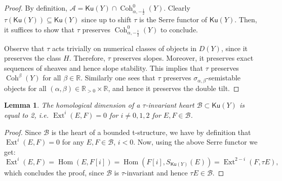 \documentclass[11pt]{amsart}
\newtheorem{lemma}[thm]{Lemma}
\theoremstyle{definition}
\newcommand{\R}{\mathbb{R}}
\DeclareMathOperator{\Hom}{Hom}
\DeclareMathOperator{\Ext}{Ext}
\DeclareMathOperator{\Coh}{Coh}
\newcommand{\sB}{\mathcal{B}}
\newcommand{\AAA}[1]{\textcolor{red}{#1}}
\newcommand{\Ku}{\mathsf{Ku}}
\begin{document}
\begin{proof}
By definition, $\mathcal{A}= \Ku(Y) \cap \Coh^0_{\alpha,-\frac{1}{2}}(Y)$. Clearly $\tau(\Ku(Y))\subseteq \Ku(Y)$ since up to shift $\tau$ is the Serre functor of $\Ku(Y)$. Then, it suffices to show that $\tau$ preserves $\Coh^0_{\alpha,-\frac{1}{2}}(Y)$ to conclude.

Observe that $\tau$ acts trivially on numerical classes of objects in $D(Y)$, since it preserves the class $H$. Therefore, $\tau$ preserves slopes. Moreover, it preserves exact sequences of sheaves and hence slope stability. This implies that $\tau$ preserves $\Coh^\beta(Y)$ for all $\beta\in \R$. Similarly one sees that $\tau$ preserves $\sigma_{\alpha,\beta}$-semistable objects for all $(\alpha,\beta)\in \R_{>0}\times \R$, and hence it preserves the double tilt. %
\end{proof}

\begin{lemma}\label{extdimension}
The homological dimension of a $\tau$-invariant heart $\mathcal{B}\subset \Ku(Y)$ is equal to 2, \textit{i.e.} $\Ext^i(E,F)=0$ for $i\neq 0,1,2$ for $E, F\in \mathcal{B}$.
\end{lemma}
\begin{proof}
Since $\mathcal{B}$ is the heart of a bounded t-structure, we have by definition that $\Ext^i(E,F)=0$ for any $E,F \in \mathcal B$, $i<0$. Now, using the above Serre functor we get:
\[
\Ext^i(E,F)=\Hom(E,F[i])= \Hom(F[i],S_{\Ku(Y)}(E))= \Ext^{2-i}(F ,\tau E),
\]
which concludes the proof, since $\sB$ is $\tau$-invariant and hence $\tau E \in \mathcal{B}$.
\end{proof}
\end{document}
